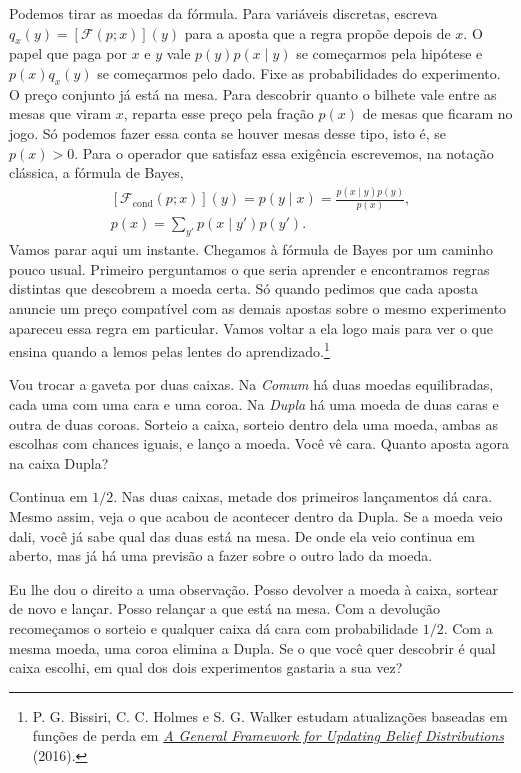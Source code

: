 Podemos tirar as moedas da fórmula. Para variáveis discretas, escreva $q_x(y)=[\mathcal F(p;x)](y)$ para a aposta que a regra propõe depois de $x$. O papel que paga por $x$ e $y$ vale $p(y)p(x\mid y)$ se começarmos pela hipótese e $p(x)q_x(y)$ se começarmos pelo dado. Fixe as probabilidades do experimento. O preço conjunto já está na mesa. Para descobrir quanto o bilhete vale entre as mesas que viram $x$, reparta esse preço pela fração $p(x)$ de mesas que ficaram no jogo. Só podemos fazer essa conta se houver mesas desse tipo, isto é, se $p(x)>0$. Para o operador que satisfaz essa exigência escrevemos, na notação clássica, a fórmula de Bayes,
\[
 \begin{gathered}
 [\mathcal F_{\mathrm{cond}}(p;x)](y)=p(y\mid x)
 =\frac{p(x\mid y)p(y)}{p(x)},\\[4pt]
 p(x)=\sum_{y'}p(x\mid y')p(y').
 \end{gathered}
\]
Vamos parar aqui um instante. Chegamos à fórmula de Bayes por um caminho pouco usual. Primeiro perguntamos o que seria aprender e encontramos regras distintas que descobrem a moeda certa. Só quando pedimos que cada aposta anuncie um preço compatível com as demais apostas sobre o mesmo experimento apareceu essa regra em particular. Vamos voltar a ela logo mais para ver o que ensina quando a lemos pelas lentes do aprendizado.\footnote{P. G. Bissiri, C. C. Holmes e S. G. Walker estudam atualizações baseadas em funções de perda em \href{https://doi.org/10.1111/rssb.12158}{\emph{A General Framework for Updating Belief Distributions}} (2016).}

Vou trocar a gaveta por duas caixas. Na \emph{Comum} há duas moedas equilibradas, cada uma com uma cara e uma coroa. Na \emph{Dupla} há uma moeda de duas caras e outra de duas coroas. Sorteio a caixa, sorteio dentro dela uma moeda, ambas as escolhas com chances iguais, e lanço a moeda. Você vê cara. Quanto aposta agora na caixa Dupla?

Continua em \(1/2\). Nas duas caixas, metade dos primeiros lançamentos dá cara. Mesmo assim, veja o que acabou de acontecer dentro da Dupla. Se a moeda veio dali, você já sabe qual das duas está na mesa. De onde ela veio continua em aberto, mas já há uma previsão a fazer sobre o outro lado da moeda.

Eu lhe dou o direito a uma observação. Posso devolver a moeda à caixa, sortear de novo e lançar. Posso relançar a que está na mesa. Com a devolução recomeçamos o sorteio e qualquer caixa dá cara com probabilidade \(1/2\). Com a mesma moeda, uma coroa elimina a Dupla. Se o que você quer descobrir é qual caixa escolhi, em qual dos dois experimentos gastaria a sua vez?

